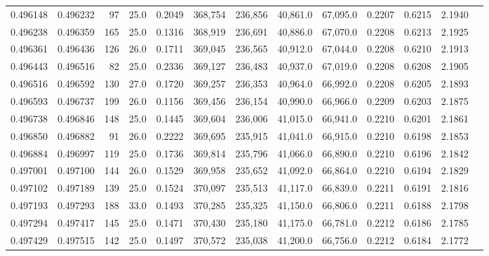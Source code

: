 \begin{tabular}{rrrrrrrrrrrrr}
0.496148 & 0.496232 &    97 & 25.0 &                                     0.2049 & 368,754 & 236,856 &  40,861.0 &  67,095.0 & 0.2207 & 0.6215 & 2.1940 \\
0.496238 & 0.496359 &   165 & 25.0 &                                     0.1316 & 368,919 & 236,691 &  40,886.0 &  67,070.0 & 0.2208 & 0.6213 & 2.1925 \\
0.496361 & 0.496436 &   126 & 26.0 &                                     0.1711 & 369,045 & 236,565 &  40,912.0 &  67,044.0 & 0.2208 & 0.6210 & 2.1913 \\
0.496443 & 0.496516 &    82 & 25.0 &                                     0.2336 & 369,127 & 236,483 &  40,937.0 &  67,019.0 & 0.2208 & 0.6208 & 2.1905 \\
0.496516 & 0.496592 &   130 & 27.0 &                                     0.1720 & 369,257 & 236,353 &  40,964.0 &  66,992.0 & 0.2208 & 0.6205 & 2.1893 \\
0.496593 & 0.496737 &   199 & 26.0 &                                     0.1156 & 369,456 & 236,154 &  40,990.0 &  66,966.0 & 0.2209 & 0.6203 & 2.1875 \\
0.496738 & 0.496846 &   148 & 25.0 &                                     0.1445 & 369,604 & 236,006 &  41,015.0 &  66,941.0 & 0.2210 & 0.6201 & 2.1861 \\
0.496850 & 0.496882 &    91 & 26.0 &                                     0.2222 & 369,695 & 235,915 &  41,041.0 &  66,915.0 & 0.2210 & 0.6198 & 2.1853 \\
0.496884 & 0.496997 &   119 & 25.0 &                                     0.1736 & 369,814 & 235,796 &  41,066.0 &  66,890.0 & 0.2210 & 0.6196 & 2.1842 \\
0.497001 & 0.497100 &   144 & 26.0 &                                     0.1529 & 369,958 & 235,652 &  41,092.0 &  66,864.0 & 0.2210 & 0.6194 & 2.1829 \\
0.497102 & 0.497189 &   139 & 25.0 &                                     0.1524 & 370,097 & 235,513 &  41,117.0 &  66,839.0 & 0.2211 & 0.6191 & 2.1816 \\
0.497193 & 0.497293 &   188 & 33.0 &                                     0.1493 & 370,285 & 235,325 &  41,150.0 &  66,806.0 & 0.2211 & 0.6188 & 2.1798 \\
0.497294 & 0.497417 &   145 & 25.0 &                                     0.1471 & 370,430 & 235,180 &  41,175.0 &  66,781.0 & 0.2212 & 0.6186 & 2.1785 \\
0.497429 & 0.497515 &   142 & 25.0 &                                     0.1497 & 370,572 & 235,038 &  41,200.0 &  66,756.0 & 0.2212 & 0.6184 & 2.1772 \\

\end{tabular}
